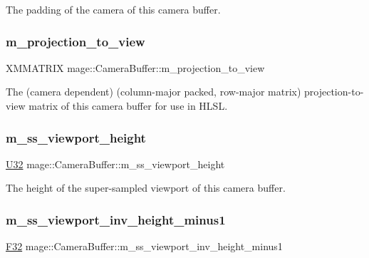 The padding of the camera of this camera buffer. \hypertarget{structmage_1_1_camera_buffer_ad64e571c4fd9595c2fcd40bfd602e024}{}\label{structmage_1_1_camera_buffer_ad64e571c4fd9595c2fcd40bfd602e024} 
\subsubsection{\texorpdfstring{m\+\_\+projection\+\_\+to\+\_\+view}{m\_projection\_to\_view}}
{\footnotesize\ttfamily X\+M\+M\+A\+T\+R\+IX mage\+::\+Camera\+Buffer\+::m\+\_\+projection\+\_\+to\+\_\+view}

The (camera dependent) (column-\/major packed, row-\/major matrix) projection-\/to-\/view matrix of this camera buffer for use in H\+L\+SL. \hypertarget{structmage_1_1_camera_buffer_a6bbc5a57e9f456518afacf0a0e5633ed}{}\label{structmage_1_1_camera_buffer_a6bbc5a57e9f456518afacf0a0e5633ed} 
\subsubsection{\texorpdfstring{m\+\_\+ss\+\_\+viewport\+\_\+height}{m\_ss\_viewport\_height}}
{\footnotesize\ttfamily \hyperlink{namespacemage_a41c104c036fba3756a74e19f793eeaa1}{U32} mage\+::\+Camera\+Buffer\+::m\+\_\+ss\+\_\+viewport\+\_\+height}

The height of the super-\/sampled viewport of this camera buffer. \hypertarget{structmage_1_1_camera_buffer_a62f3a9c95c3e3cecfc1744de82ac2ca2}{}\label{structmage_1_1_camera_buffer_a62f3a9c95c3e3cecfc1744de82ac2ca2} 
\subsubsection{\texorpdfstring{m\+\_\+ss\+\_\+viewport\+\_\+inv\+\_\+height\+\_\+minus1}{m\_ss\_viewport\_inv\_height\_minus1}}
{\footnotesize\ttfamily \hyperlink{namespacemage_aa97e833b45f06d60a0a9c4fc22ae02c0}{F32} mage\+::\+Camera\+Buffer\+::m\+\_\+ss\+\_\+viewport\+\_\+inv\+\_\+height\+\_\+minus1}

